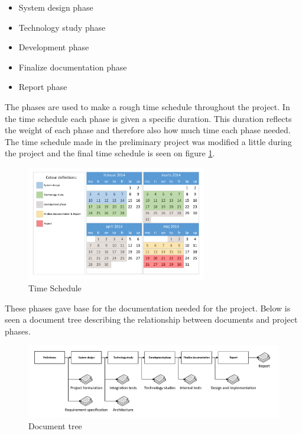 \begin{itemize}
	\item System design phase
	\item Technology study phase
	\item Development phase
	\item Finalize documentation phase
	\item Report phase
	\label{it:phases}
\end{itemize}

The phases are used to make a rough time schedule throughout the project. In the time schedule each phase is given a specific duration. This duration reflects the weight of each phase and therefore also how much time each phase needed. The time schedule made in the preliminary project was modified a little during the project and the final time schedule is seen on figure \ref{fig:TimeSched}.

\begin{figure}[hbpt]
	\centering
	\includegraphics[width=0.7\textwidth]{billeder/9projectexecution/Timeschedule_neat}
	\caption{Time Schedule}
	\label{fig:TimeSched}
\end{figure}

These phases gave base for the documentation needed for the project. Below is seen a document tree describing the relationship between documents and project phases.

\begin{figure}[hbpt]
	\centering
	\includegraphics[width=.95\textwidth]{billeder/9projectexecution/documenttree}
	\caption{Document tree}
\end{figure}

